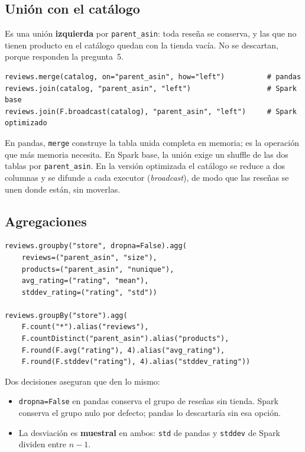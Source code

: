 \documentclass[11pt,a4paper]{article}
\begin{document}
\subsection{Unión con el catálogo}

Es una unión \textbf{izquierda} por \texttt{parent\_asin}: toda reseña se conserva, y las que
no tienen producto en el catálogo quedan con la tienda vacía. No se descartan, porque
responden la pregunta~5.

\begin{lstlisting}[caption={Unión en pandas, en Spark base y en Spark optimizado.}]
reviews.merge(catalog, on="parent_asin", how="left")          # pandas
reviews.join(catalog, "parent_asin", "left")                  # Spark base
reviews.join(F.broadcast(catalog), "parent_asin", "left")     # Spark optimizado
\end{lstlisting}

En pandas, \texttt{merge} construye la tabla unida completa en memoria; es la operación que
más memoria necesita. En Spark base, la unión exige un shuffle de las dos tablas por
\texttt{parent\_asin}. En la versión optimizada el catálogo se reduce a dos columnas y se
difunde a cada executor (\emph{broadcast}), de modo que las reseñas se unen donde están, sin
moverlas.

\subsection{Agregaciones}

\begin{lstlisting}[caption={Agregado por tienda en pandas (arriba) y en Spark (abajo).}]
reviews.groupby("store", dropna=False).agg(
    reviews=("parent_asin", "size"),
    products=("parent_asin", "nunique"),
    avg_rating=("rating", "mean"),
    stddev_rating=("rating", "std"))

reviews.groupBy("store").agg(
    F.count("*").alias("reviews"),
    F.countDistinct("parent_asin").alias("products"),
    F.round(F.avg("rating"), 4).alias("avg_rating"),
    F.round(F.stddev("rating"), 4).alias("stddev_rating"))
\end{lstlisting}

Dos decisiones aseguran que den lo mismo:

\begin{itemize}
  \item \texttt{dropna=False} en pandas conserva el grupo de reseñas sin tienda. Spark
  conserva el grupo nulo por defecto; pandas lo descartaría sin esa opción.
  \item La desviación es \textbf{muestral} en ambos: \texttt{std} de pandas y
  \texttt{stddev} de Spark dividen entre $n-1$.
\end{itemize}
\end{document}
